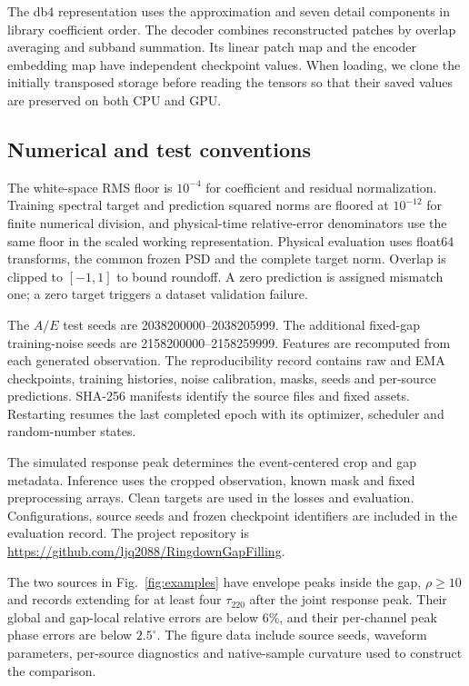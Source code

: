 \documentclass[10pt,prd,aps,a4paper,twocolumn,superscriptaddress,nofootinbib,floatfix]{revtex4-2}
\begin{document}
The db4 representation uses the approximation and seven detail components in library coefficient order. The decoder combines reconstructed patches by overlap averaging and subband summation. Its linear patch map and the encoder embedding map have independent checkpoint values. When loading, we clone the initially transposed storage before reading the tensors so that their saved values are preserved on both CPU and GPU.

\subsection{Numerical and test conventions}
The white-space RMS floor is $10^{-4}$ for coefficient and residual normalization. Training spectral target and prediction squared norms are floored at $10^{-12}$ for finite numerical division, and physical-time relative-error denominators use the same floor in the scaled working representation. Physical evaluation uses float64 transforms, the common frozen PSD and the complete target norm. Overlap is clipped to $[-1,1]$ to bound roundoff. A zero prediction is assigned mismatch one; a zero target triggers a dataset validation failure.

The $A/E$ test seeds are 2038200000--2038205999. The additional fixed-gap training-noise seeds are 2158200000--2158259999. Features are recomputed from each generated observation. The reproducibility record contains raw and EMA checkpoints, training histories, noise calibration, masks, seeds and per-source predictions. SHA-256 manifests identify the source files and fixed assets. Restarting resumes the last completed epoch with its optimizer, scheduler and random-number states.

The simulated response peak determines the event-centered crop and gap metadata. Inference uses the cropped observation, known mask and fixed preprocessing arrays. Clean targets are used in the losses and evaluation. Configurations, source seeds and frozen checkpoint identifiers are included in the evaluation record. The project repository is \url{https://github.com/ljq2088/RingdownGapFilling}.

The two sources in Fig.~\ref{fig:examples} have envelope peaks inside the gap, $\rho\ge10$ and records extending for at least four $\tau_{220}$ after the joint response peak. Their global and gap-local relative errors are below 6\%, and their per-channel peak phase errors are below $2.5^\circ$. The figure data include source seeds, waveform parameters, per-source diagnostics and native-sample curvature used to construct the comparison.
\end{document}

